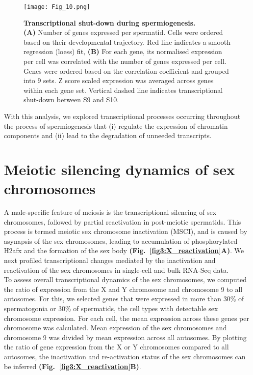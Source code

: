 \begin{figure}[!h]
\centering
\texttt{[image: Fig\_10.png]}
\caption[Transcriptional shut-down during spermiogenesis]{\textbf{Transcriptional shut-down during spermiogenesis.} \\
\textbf{(A)} Number of genes expressed per spermatid. Cells were ordered based on their developmental trajectory. Red line indicates a smooth regression (loess) fit, \textbf{(B)} For each gene, its normalised expression per cell was correlated with the number of genes expressed per cell. Genes were ordered based on the correlation coefficient and grouped into 9 sets. Z score scaled expression was averaged across genes within each gene set. Vertical dashed line indicates transcriptional shut-down between S9 and S10.}
\label{fig3:transcriptional_shutdown}
\end{figure}

With this analysis, we explored transcriptional processes occurring throughout the process of spermiogenesis that (i) regulate the expression of chromatin components and (ii) lead to the degradation of unneeded transcripts.

\newpage

\section{Meiotic silencing dynamics of sex chromosomes}

A male-specific feature of meiosis is the transcriptional silencing of sex chromosomes, followed by partial reactivation in post-meiotic spermatids. This process is termed meiotic sex chromosome inactivation (MSCI), and is caused by asynapsis of the sex chromosomes, leading to accumulation of phosphorylated H2afx and the formation of the sex body \citep{Hamer2003} \textbf{(Fig.~\ref{fig3:X_reactivation}A)}. We next profiled transcriptional changes mediated by the inactivation and reactivation of the sex chromosomes in single-cell and bulk RNA-Seq data. \\

To assess overall transcriptional dynamics of the sex chromosomes, we computed the ratio of expression from the X and Y chromosome and chromosome 9 to all autosomes. For this, we selected genes that were expressed in more than 30\% of spermatogonia or 30\% of spermatids, the cell types with detectable sex chromosome expression. For each cell, the mean expression across these genes per chromosome was calculated. Mean expression of the sex chromosomes and chromosome 9 was divided by mean expression across all autosomes. By plotting the ratio of gene expression from the X or Y chromosomes compared to all autosomes, the inactivation and re-activation status of the sex chromosomes can be inferred \textbf{(Fig.~\ref{fig3:X_reactivation}B)}. \\

